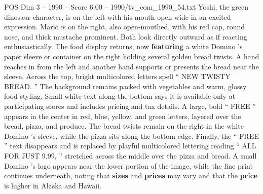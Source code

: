 \begin{textsample}{POS Dim 3 – 1990 – Score 6.00 – 1990/tv\_com\_1990\_54.txt}
Yoshi, the green dinosaur character, is on the left with his mouth open wide in an excited expression.
Mario is on the right, also open-mouthed, with his red cap, round nose, and thick mustache prominent.
Both look directly outward as if reacting enthusiastically.
The food display returns, now \textbf{featuring} a white Domino ’s paper sleeve or container on the right holding several golden bread twists.
A hand reaches in from the left and another hand supports or presents the bread near the sleeve.
Across the top, bright multicolored letters spell “ NEW TWISTY BREAD. ” The background remains packed with vegetables and warm, glossy food styling.
Small white text along the bottom says it is available only at participating stores and includes pricing and tax details.
A large, bold “ FREE ” appears in the center in red, blue, yellow, and green letters, layered over the bread, pizza, and produce.
The bread twists remain on the right in the white Domino ’s sleeve, while the pizza sits along the bottom edge.
Finally, the “ FREE ” text disappears and is replaced by playful multicolored lettering reading “ ALL FOR JUST 9.99, ” stretched across the middle over the pizza and bread.
A small Domino ’s logo appears near the lower portion of the image, while the fine print continues underneath, noting that \textbf{sizes} and \textbf{prices} may vary and that the \textbf{price} is higher in Alaska and Hawaii.

\end{textsample}
